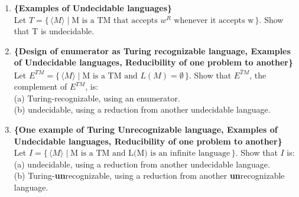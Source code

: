 \documentclass[11pt, article, oneside]{memoir}
\newcommand{\set}[1]{\{\, #1\, \}}
\begin{document}
\begin{enumerate}
    \item
    \textbf{\{Examples of Undecidable languages\}}
    \\Let \(T = \set{\langle M\rangle \mid \text{M is a TM that accepts }w^R \text{ whenever it accepts w}}\). Show that T is undecidable.

    \item
    \textbf{\{Design of enumerator as Turing recognizable language, Examples of Undecidable languages, Reducibility of one problem to another\}}
    \\Let \(E^{TM} = \set{\langle M\rangle \mid \text{M is a TM and }L(M) = \emptyset}\). Show that \(\overline{E^{TM}}\), the complement of \(E^{TM}\), is:
    \\(a) Turing-recognizable, using an enumerator.
    \\(b) undecidable, using a reduction from another undecidable language.

    \item
    \textbf{\{One example of Turing Unrecognizable language, Examples of Undecidable languages, Reducibility of one problem to another\}}
    \\Let \(I = \set{\langle M\rangle \mid \text{M is a TM and L(M) is an infinite language}}\). Show that \(I\) is:
    \\(a) undecidable, using a reduction from another undecidable language.
    \\(b) Turing-\textbf{un}recognizable, using a reduction from another \textbf{un}recognizable language.
    















\end{enumerate}
\end{document}
